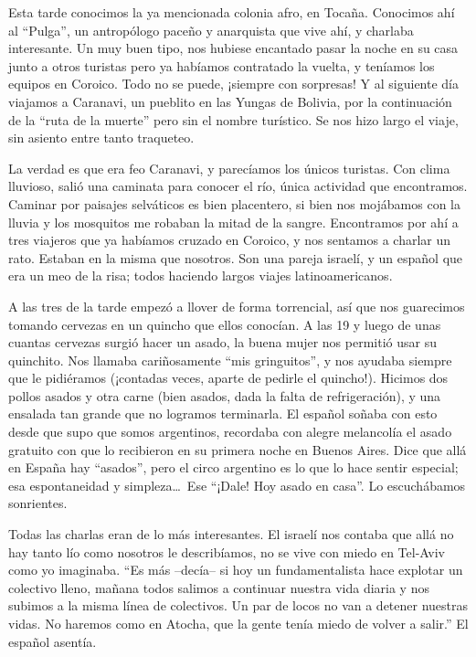 Esta tarde conocimos la ya mencionada colonia afro, en Tocaña. Conocimos ahí
al ``Pulga'', un antropólogo paceño y anarquista que vive ahí, y charlaba
interesante. Un muy buen tipo, nos hubiese encantado pasar la noche en su casa
junto a otros turistas pero ya habíamos contratado la vuelta, y teníamos los
equipos en Coroico. Todo no se puede, ¡siempre con sorpresas! Y
al siguiente día viajamos a Caranavi, un pueblito en las Yungas de Bolivia, por
la continuación de la ``ruta de la muerte'' pero sin el nombre turístico. Se
nos hizo largo el viaje, sin asiento entre tanto traqueteo.

La verdad es que era feo Caranavi, y parecíamos los únicos turistas. Con clima
lluvioso, salió una caminata para conocer el río, única actividad que
encontramos. Caminar por paisajes selváticos es bien placentero, si bien nos
mojábamos con la lluvia y los mosquitos me robaban la mitad de la sangre.
Encontramos por ahí a tres viajeros que ya habíamos cruzado en Coroico, y nos
sentamos a charlar un rato. Estaban en la misma que nosotros. Son una pareja
israelí, y un español que era un meo de la risa; todos haciendo largos viajes
latinoamericanos.

A las tres de la tarde empezó a llover de forma torrencial, así que nos
guarecimos tomando cervezas en un quincho que ellos conocían. A las 19 y luego
de unas cuantas cervezas surgió hacer un asado, la buena mujer nos permitió
usar su quinchito. Nos llamaba cariñosamente ``mis gringuitos'', y nos ayudaba
siempre que le pidiéramos (¡contadas veces, aparte de pedirle el
quincho!). Hicimos dos pollos asados y otra carne (bien asados, dada la falta de
refrigeración), y una ensalada tan grande que no logramos terminarla. El
español soñaba con esto desde que supo que somos argentinos, recordaba con
alegre melancolía el asado gratuito con que lo recibieron en su primera noche
en Buenos Aires. Dice que allá en España hay ``asados'', pero el circo
argentino es lo que lo hace sentir especial; esa espontaneidad y simpleza\ldots\
Ese ``¡Dale! Hoy asado en casa''. Lo escuchábamos sonrientes.

Todas las charlas eran de lo más interesantes. El israelí nos contaba que
allá no hay tanto lío como nosotros le describíamos, no se vive con miedo en
Tel-Aviv como yo imaginaba. ``Es más --decía-- si hoy un fundamentalista hace
explotar un colectivo lleno, mañana todos salimos a continuar nuestra vida
diaria y nos subimos a la misma línea de colectivos. Un par de locos no van a
detener nuestras vidas. No haremos como en Atocha, que la gente tenía miedo de
volver a salir.'' El español asentía.

